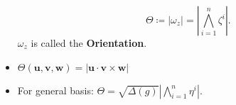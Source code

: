 \documentclass[10pt]{article}
\newcommand{\abs}[1]{\left\lvert#1\right\rvert}
\begin{document}
\begin{multicols*}{3}
\begin{itemize}
            \begin{equation*}
                \Theta \coloneqq \abs{\omega_z} = \abs{\bigwedge_{i = 1}^n\zeta^i}.
            \end{equation*}
            $\omega_z$ is called the \textbf{Orientation}.
            \item $\Theta\left(\bm{u}, \bm{v}, \bm{w}\right) = \abs{\bm{u} \cdot \bm{v} \times \bm{w}}$
            \item For general basis: $\Theta = \sqrt{\Delta(g)}\abs{\bigwedge_{i = 1}^n\eta^i}$.
        \end{itemize}
    \end{multicols*}
\end{document}
